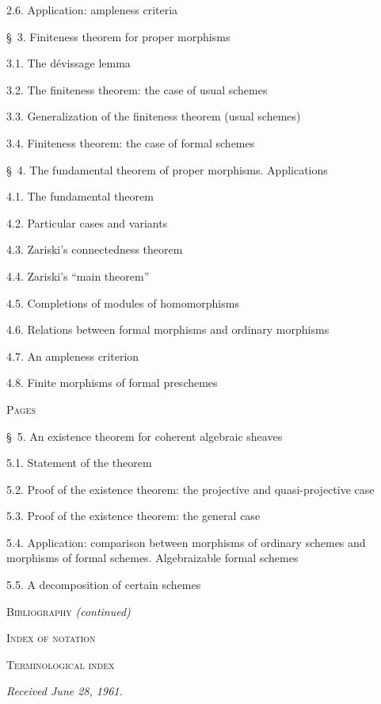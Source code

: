 \begin{flushleft}
2.6. Application: ampleness criteria 

\medskip
\S~3. Finiteness theorem for proper morphisms 

3.1. The dévissage lemma 

3.2. The finiteness theorem: the case of usual schemes 

3.3. Generalization of the finiteness theorem (usual schemes) 

3.4. Finiteness theorem: the case of formal schemes 

\medskip
\S~4. The fundamental theorem of proper morphisms. Applications 

4.1. The fundamental theorem 

4.2. Particular cases and variants 

4.3. Zariski's connectedness theorem 

4.4. Zariski's ``main theorem'' 

4.5. Completions of modules of homomorphisms 

4.6. Relations between formal morphisms and ordinary morphisms 

4.7. An ampleness criterion 

4.8. Finite morphisms of formal preschemes 


\hfill\textsc{Pages}

\S~5. An existence theorem for coherent algebraic sheaves 

5.1. Statement of the theorem 

5.2. Proof of the existence theorem: the projective and quasi-projective case

5.3. Proof of the existence theorem: the general case 

5.4. Application: comparison between morphisms of ordinary schemes and
morphisms of formal schemes. Algebraizable formal schemes 

5.5. A decomposition of certain schemes 

\medskip
\textsc{Bibliography} \textit{(continued)} 

\textsc{Index of notation} 

\textsc{Terminological index} 

\begin{flushright}
\emph{Received June 28, 1961.}
\end{flushright}
\end{flushleft}
